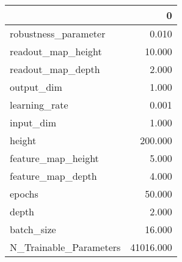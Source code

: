 \begin{tabular}{lr}
\toprule
{} &          0 \\
\midrule
robustness\_parameter   &      0.010 \\
readout\_map\_height     &     10.000 \\
readout\_map\_depth      &      2.000 \\
output\_dim             &      1.000 \\
learning\_rate          &      0.001 \\
input\_dim              &      1.000 \\
height                 &    200.000 \\
feature\_map\_height     &      5.000 \\
feature\_map\_depth      &      4.000 \\
epochs                 &     50.000 \\
depth                  &      2.000 \\
batch\_size             &     16.000 \\
N\_Trainable\_Parameters &  41016.000 \\
\bottomrule
\end{tabular}
